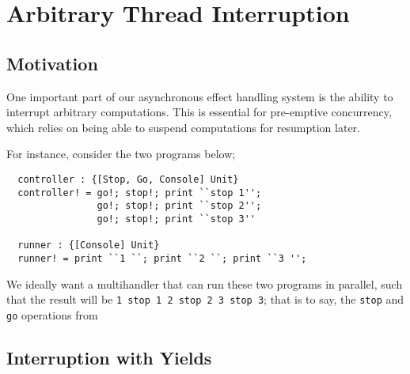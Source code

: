 \documentclass[msc,deptreport,cs]{infthesis} %
\newcommand{\code}[1]{\lstinline{#1}}
\begin{document}
\chapter{Arbitrary Thread Interruption}

\section{Motivation}

One important part of our asynchronous effect handling system is the ability to
interrupt arbitrary computations. This is essential for pre-emptive concurrency,
which relies on being able to suspend computations for resumption later.







For instance, consider the two programs below;

\begin{lstlisting}
  controller : {[Stop, Go, Console] Unit}
  controller! = go!; stop!; print ``stop 1'';
                go!; stop!; print ``stop 2'';
                go!; stop!; print ``stop 3''

  runner : {[Console] Unit}
  runner! = print ``1 ``; print ``2 ``; print ``3 '';
\end{lstlisting}

\noindent We ideally want a multihandler that can run these two programs in
parallel, such that the result will be \code{1 stop 1 2 stop 2 3 stop 3};
that is to say, the \code{stop} and \code{go} operations from

\section{Interruption with Yields}
\end{document}
